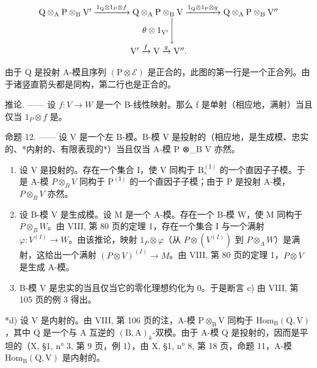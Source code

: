 \[
\begin{array}{c} \mathrm{Q} \otimes_ {\mathrm{A}} \mathrm{P} \otimes_ {\mathrm{B}} \mathrm{V} ^ {\prime} \xrightarrow {1 _ {\mathrm{Q}} \otimes 1 _ {\mathrm{P}} \otimes f} \mathrm{Q} \otimes_ {\mathrm{A}} \mathrm{P} \otimes_ {\mathrm{B}} \mathrm{V} \xrightarrow {1 _ {\mathrm{Q}} \otimes 1 _ {\mathrm{P}} \otimes g} \mathrm{Q} \otimes_ {\mathrm{A}} \mathrm{P} \otimes_ {\mathrm{B}} \mathrm{V} ^ {\prime \prime} \\ \theta \otimes 1 _ {\mathrm{V} ^ {\prime}} \Biggl \downarrow \\ \mathrm{V} ^ {\prime} \xrightarrow {f} \mathrm{V} \xrightarrow {g} \mathrm{V} ^ {\prime \prime}. \end{array}
\]

由于 Q 是投射 A-模且序列 \((\mathrm{P} \otimes \mathcal{E})\) 是正合的，此图的第一行是一个正合列。由于诸竖直箭头都是同构，第二行也是正合的。

推论. —— 设 \(f: V \rightarrow W\) 是一个 B-线性映射。那么 f 是单射（相应地，满射）当且仅当 \(1_{P} \otimes f\) 是。

命题 12. —— 设 V 是一个左 B-模。B-模 V 是投射的（相应地，是生成模、忠实的、*内射的、有限表现的*）当且仅当 A-模 P ⊗\_B V 亦然。

\begin{enumerate}
\def\labelenumi{\alph{enumi})}
\item
  设 V 是投射的。存在一个集合 I，使 V 同构于 \(\mathrm{B}_{s}^{(\mathrm{I})}\) 的一个直因子子模。于是 A-模 \(P \otimes_{B} V\) 同构于 \(\mathrm{P}^{(\mathrm{I})}\) 的一个直因子子模；由于 P 是投射 A-模，\(P \otimes_{B} V\) 亦然。
\item
  设 B-模 V 是生成模。设 M 是一个 A-模。存在一个 B-模 W，使 M 同构于 \(P \otimes_{B} W\)。由 VIII, 第 80 页的定理 1，存在一个集合 I 与一个满射 \(\varphi : V^{(I)} \to W\)。由该推论，映射 \(1_{P} \otimes \varphi\)（从 \(P \otimes (V^{(I)})\) 到 \(P \otimes_{A} W\)）是满射，这给出一个满射 \((P \otimes V)^{(I)} \to M\)。由 VIII, 第 80 页的定理 1，\(P \otimes V\) 是生成 A-模。
\item
  B-模 V 是忠实的当且仅当它的零化理想约化为 0。于是断言 c) 由 VIII, 第 105 页的例 3 得出。
\end{enumerate}

*d) 设 V 是内射的。由 VIII, 第 106 页的注，A-模 \(\mathrm{P} \otimes_{\mathrm{B}} \mathrm{V}\) 同构于 \(\mathrm{Hom}_{\mathrm{B}}(\mathrm{Q}, \mathrm{V})\)，其中 Q 是一个与 A 互逆的 \((\mathrm{B}, \mathrm{A})_k\)-双模。由于 A-模 Q 是投射的，因而是平坦的（X, §1, n° 3, 第 9 页，例 1），由 X, §1, n° 8, 第 18 页，命题 11，A-模 \(\mathrm{Hom}_{\mathrm{B}}(\mathrm{Q}, \mathrm{V})\) 是内射的。

